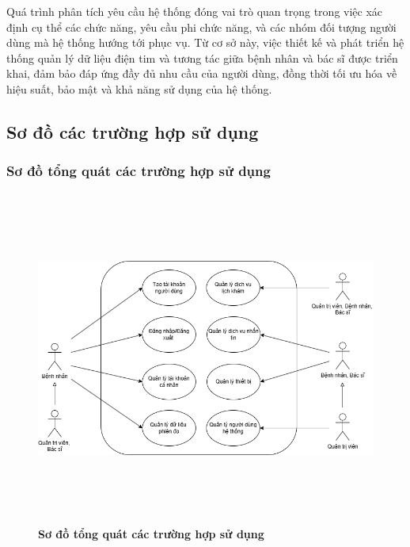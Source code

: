 Quá trình phân tích yêu cầu hệ thống đóng vai trò quan trọng trong việc xác định cụ thể các chức năng, yêu cầu phi chức năng, và các nhóm đối tượng người dùng mà hệ thống hướng tới phục vụ.
Từ cơ sở này, việc thiết kế và phát triển hệ thống quản lý dữ liệu điện tim và tương tác giữa bệnh nhân và bác sĩ được triển khai, đảm bảo đáp ứng đầy đủ nhu cầu của người dùng,
đồng thời tối ưu hóa về hiệu suất, bảo mật và khả năng sử dụng của hệ thống.


\subsection{Sơ đồ các trường hợp sử dụng}

\subsubsection{Sơ đồ tổng quát các trường hợp sử dụng}

\begin{figure}[H]
	\centering
	\includegraphics[width=16cm,height=11cm]{Images/use_case/use_case_general.png}
	\caption[Sơ đồ tổng quát các trường hợp sử dụng của hệ thống]{\bfseries \fontsize{12pt}{0pt}
		\selectfont Sơ đồ tổng quát các trường hợp sử dụng}
	\label{use_case_general} %
\end{figure}


